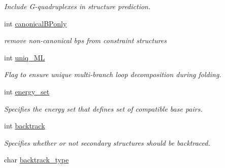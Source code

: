 \begin{DoxyCompactItemize}
\begin{DoxyCompactList}\small\item\em Include G-\/quadruplexes in structure prediction. \end{DoxyCompactList}\item 
int \hyperlink{structvrna__md__s_a87edce006e9daff84363ec0e6abd2182}{canonical\+B\+Ponly}\hypertarget{structvrna__md__s_a87edce006e9daff84363ec0e6abd2182}{}\label{structvrna__md__s_a87edce006e9daff84363ec0e6abd2182}

\begin{DoxyCompactList}\small\item\em remove non-\/canonical bp\textquotesingle{}s from constraint structures \end{DoxyCompactList}\item 
int \hyperlink{structvrna__md__s_ade065b814a4e2e72ead93ab502613ed2}{uniq\+\_\+\+ML}\hypertarget{structvrna__md__s_ade065b814a4e2e72ead93ab502613ed2}{}\label{structvrna__md__s_ade065b814a4e2e72ead93ab502613ed2}

\begin{DoxyCompactList}\small\item\em Flag to ensure unique multi-\/branch loop decomposition during folding. \end{DoxyCompactList}\item 
int \hyperlink{structvrna__md__s_a5eee4e3b468eb690d1407e0178dafb3f}{energy\+\_\+set}\hypertarget{structvrna__md__s_a5eee4e3b468eb690d1407e0178dafb3f}{}\label{structvrna__md__s_a5eee4e3b468eb690d1407e0178dafb3f}

\begin{DoxyCompactList}\small\item\em Specifies the energy set that defines set of compatible base pairs. \end{DoxyCompactList}\item 
int \hyperlink{structvrna__md__s_a31f4471608cbdd03887f63c281823adb}{backtrack}\hypertarget{structvrna__md__s_a31f4471608cbdd03887f63c281823adb}{}\label{structvrna__md__s_a31f4471608cbdd03887f63c281823adb}

\begin{DoxyCompactList}\small\item\em Specifies whether or not secondary structures should be backtraced. \end{DoxyCompactList}\item 
char \hyperlink{structvrna__md__s_abb265da25121d22ed11c8435861f0e53}{backtrack\+\_\+type}\hypertarget{structvrna__md__s_abb265da25121d22ed11c8435861f0e53}{}\label{structvrna__md__s_abb265da25121d22ed11c8435861f0e53}


\end{DoxyCompactItemize}
